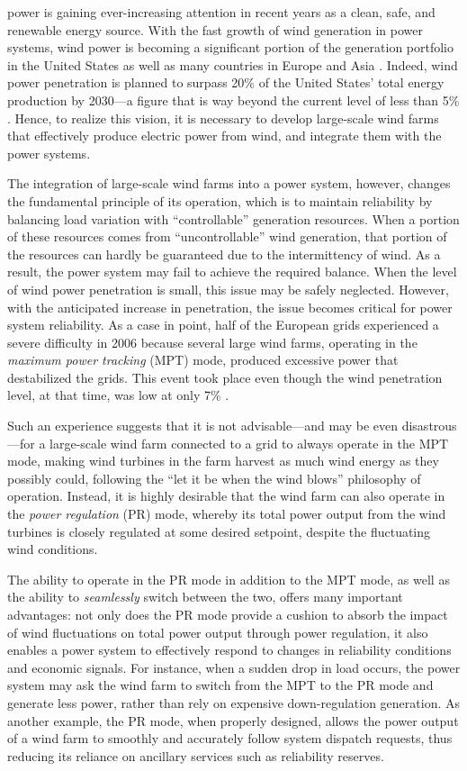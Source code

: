 \documentclass[journal]{IEEEtran}
\begin{document}
 power is gaining ever-increasing attention in recent years as a clean, safe, and renewable energy source. With the fast growth of wind generation in power systems, wind power is becoming a significant portion of the generation portfolio in the United States as well as many countries in Europe and Asia \cite{Eriksen05}. Indeed, wind power penetration is planned to surpass 20\% of the United States' total energy production by 2030---a figure that is way beyond the current level of less than 5\% \cite{USDOE08}. Hence, to realize this vision, it is necessary to develop large-scale wind farms that effectively produce electric power from wind, and integrate them with the power systems.

The integration of large-scale wind farms into a power system, however, changes the fundamental principle of its operation, which is to maintain reliability by balancing load variation with ``controllable'' generation resources. When a portion of these resources comes from ``uncontrollable'' wind generation, that portion of the resources can hardly be guaranteed due to the intermittency of wind. As a result, the power system may fail to achieve the required balance. When the level of wind power penetration is small, this issue may be safely neglected. However, with the anticipated increase in penetration, the issue becomes critical for power system reliability. As a case in point, half of the European grids experienced a severe difficulty in 2006 because several large wind farms, operating in the {\em maximum power tracking} (MPT) mode, produced excessive power that destabilized the grids. This event took place even though the wind penetration level, at that time, was low at only 7\% \cite{UCTE06}.

Such an experience suggests that it is not advisable---and may be even disastrous---for a large-scale wind farm connected to a grid to always operate in the MPT mode, making wind turbines in the farm harvest as much wind energy as they possibly could, following the ``let it be when the wind blows'' philosophy of operation. Instead, it is highly desirable that the wind farm can also operate in the {\em power regulation} (PR) mode, whereby its total power output from the wind turbines is closely regulated at some desired setpoint, despite the fluctuating wind conditions.

The ability to operate in the PR mode in addition to the MPT mode, as well as the ability to {\em seamlessly} switch between the two, offers many important advantages: not only does the PR mode provide a cushion to absorb the impact of wind fluctuations on total power output through power regulation, it also enables a power system to effectively respond to changes in reliability conditions and economic signals. For instance, when a sudden drop in load occurs, the power system may ask the wind farm to switch from the MPT to the PR mode and generate less power, rather than rely on expensive down-regulation generation. As another example, the PR mode, when properly designed, allows the power output of a wind farm to smoothly and accurately follow system dispatch requests, thus reducing its reliance on ancillary services such as reliability reserves.
\end{document}

